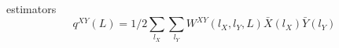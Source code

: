 \documentclass[12pt]{article}
\begin{document}
estimators
\begin{equation}
  q^{XY}(L) = 1/2 \sum_{l_X} \sum_{l_Y}
                     W^{XY}(l_X, l_Y, L) \bar{X}(l_X) \bar{Y}(l_Y)
\end{equation}

\begin{equation}
  
\end{equation}
\end{document}
